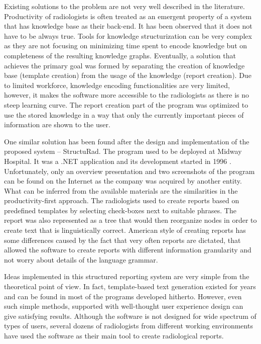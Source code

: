 \documentclass[12pt, twoside, openany]{report}
\theoremstyle{definition}
\begin{document}
Existing solutions to the problem are not very well described in the literature. Productivity of radiologists is often treated as an emergent property of a system that has knowledge base as their back-end. It has been observed that it does not have to be always true. Tools for knowledge structurization can be very complex as they are not focusing on minimizing time spent to encode knowledge but on completeness of the resulting knowledge graphs. 
Eventually, a solution that achieves the primary goal was formed by separating the creation of knowledge base (template creation) from the usage of the knowledge (report creation). Due to limited workforce, knowledge encoding functionalities are very limited, however, it makes the software more accessible to the radiologists as there is no steep learning curve. The report creation part of the program was optimized to use the stored knowledge in a way that only the currently important pieces of information are shown to the user.
 
One similar solution has been found after the design and implementation of the proposed system – StructuRad. The program used to be deployed at Midway Hospital. It was a .NET application and its development started in 1996 \cite{structurad}. Unfortunately, only an overview presentation and two screenshots of the program can be found on the Internet as the company was  acquired by another entity. What can be inferred from the available materials are the similarities in the productivity-first approach. The radiologists used to create reports based on predefined templates by selecting check-boxes next to suitable phrases. The report was also represented as a tree that would then reorganize nodes in order to create text that is linguistically correct. American style of creating reports has some differences caused by the fact that very often reports are dictated, that allowed the software to create reports with different information granularity and not worry about details of the language grammar.

Ideas implemented in this structured reporting system are very simple from the theoretical point of view. In fact, template-based text generation existed for years and can be found in most of the programs developed hitherto. However, even such simple methods, supported with well-thought user experience design can give satisfying results. 
Although the software is not designed for wide spectrum of types of users, several dozens of radiologists from different working environments have used the software as their main tool to create radiological reports. 
\end{document}
